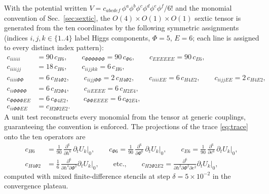 \documentclass[11pt]{article}
\newcommand{\dt}{\partial_t}
\begin{document}
With the potential written $V=c_{abcdef}\,\phi^a\phi^b\phi^c\phi^d\phi^e
\phi^f/6!$ and the monomial convention of Sec.~\ref{sec:sextic}, the
$O(4)\times O(1)\times O(1)$ sextic tensor is generated from the ten
coordinates by the following symmetric assignments (indices $i,j,k\in\{1..4\}$
label Higgs components, $\Phi=5$, $E=6$; each line is assigned to every
distinct index pattern):
\begin{align}
  \label{eq:tensor}
  c_{iiiiii}&=90\,c_{H6},\qquad c_{\Phi\Phi\Phi\Phi\Phi\Phi}=90\,c_{\Phi6},
  \qquad c_{EEEEEE}=90\,c_{E6},\\
  c_{iiiijj}&=18\,c_{H6},\qquad c_{iijjkk}=6\,c_{H6},\\
  c_{iiii\Phi\Phi}&=6\,c_{H4\Phi2},\qquad c_{iijj\Phi\Phi}=2\,c_{H4\Phi2},
  \qquad c_{iiiiEE}=6\,c_{H4E2},\qquad c_{iijjEE}=2\,c_{H4E2},\\
  c_{ii\Phi\Phi\Phi\Phi}&=6\,c_{H2\Phi4},\qquad c_{iiEEEE}=6\,c_{H2E4},\\
  c_{\Phi\Phi\Phi\Phi EE}&=6\,c_{\Phi4E2},\qquad c_{\Phi\Phi EEEE}=6\,c_{\Phi2E4},\\
  c_{ii\Phi\Phi EE}&=c_{H2\Phi2E2}.
\end{align}
A unit test reconstructs every monomial from the tensor at generic couplings,
guaranteeing the convention is enforced.  The projections of the trace
\eqref{eq:trace} onto the ten operators are
\begin{align}
  c_{H6}&=\frac{1}{90}\,\frac{\partial^6}{\partial h^6}\,\dt U_k\Big|_0,
  \qquad c_{\Phi6}=\frac{1}{90}\,\frac{\partial^6}{\partial\Phi^6}\,\dt U_k\Big|_0,
  \qquad c_{E6}=\frac{1}{90}\,\frac{\partial^6}{\partial e^6}\,\dt U_k\Big|_0,\\
  c_{H4\Phi2}&=\frac{1}{6}\,\frac{\partial^6}{\partial h^4\partial\Phi^2}
    \dt U_k\Big|_0,\qquad\text{etc.},\qquad
  c_{H2\Phi2E2}=\frac{\partial^6}{\partial h^2\partial\Phi^2\partial e^2}
    \dt U_k\Big|_0,
\end{align}
computed with mixed finite-difference stencils at step
$\delta=5\times10^{-2}$ in the convergence plateau.
\end{document}
